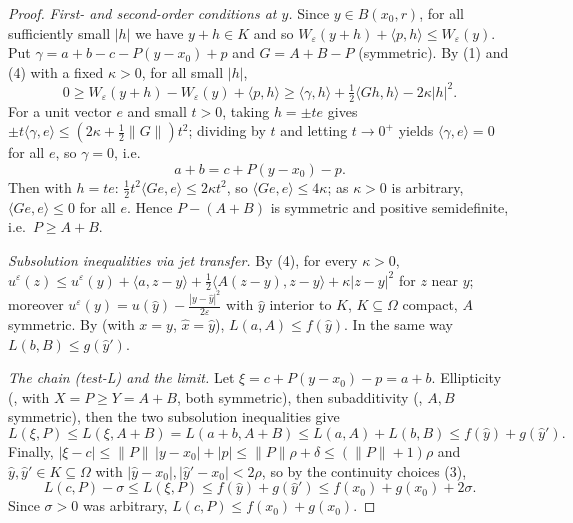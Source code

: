 \begin{proof}
\emph{First- and second-order conditions at $y$.} Since $y\in B(x_0,r)$, for all sufficiently small $|h|$ we have $y+h\in K$ and so $W_\varepsilon(y+h)+\langle p,h\rangle\le W_\varepsilon(y)$. Put $\gamma=a+b-c-P(y-x_0)+p$ and $G=A+B-P$ (symmetric). By (1) and (4) with a fixed $\kappa>0$, for all small $|h|$,
\[
0\ge W_\varepsilon(y+h)-W_\varepsilon(y)+\langle p,h\rangle\ge\langle\gamma,h\rangle+\tfrac12\langle Gh,h\rangle-2\kappa|h|^2 .
\]
For a unit vector $e$ and small $t>0$, taking $h=\pm te$ gives $\pm t\langle\gamma,e\rangle\le(2\kappa+\frac12\|G\|)t^2$; dividing by $t$ and letting $t\to0^+$ yields $\langle\gamma,e\rangle=0$ for all $e$, so $\gamma=0$, i.e.
\[
a+b=c+P(y-x_0)-p .
\]
Then with $h=te$: $\frac12t^2\langle Ge,e\rangle\le2\kappa t^2$, so $\langle Ge,e\rangle\le4\kappa$; as $\kappa>0$ is arbitrary, $\langle Ge,e\rangle\le0$ for all $e$. Hence $P-(A+B)$ is symmetric and positive semidefinite, i.e.\ $P\ge A+B$.

\emph{Subsolution inequalities via jet transfer.} By (4), for every $\kappa>0$, $u^\varepsilon(z)\le u^\varepsilon(y)+\langle a,z-y\rangle+\frac12\langle A(z-y),z-y\rangle+\kappa|z-y|^2$ for $z$ near $y$; moreover $u^\varepsilon(y)=u(\hat y)-\frac{|y-\hat y|^2}{2\varepsilon}$ with $\hat y$ interior to $K$, $K\subseteq\Omega$ compact, $A$ symmetric. By  (with $x=y$, $\hat x=\hat y$), $L(a,A)\le f(\hat y)$. In the same way $L(b,B)\le g(\hat y')$.

\emph{The chain (test-L) and the limit.} Let $\xi=c+P(y-x_0)-p=a+b$. Ellipticity (, with $X=P\ge Y=A+B$, both symmetric), then subadditivity (, $A,B$ symmetric), then the two subsolution inequalities give
\[
L(\xi,P)\le L(\xi,A+B)=L(a+b,A+B)\le L(a,A)+L(b,B)\le f(\hat y)+g(\hat y').
\]
Finally, $|\xi-c|\le\|P\|\,|y-x_0|+|p|\le\|P\|\rho+\delta\le(\|P\|+1)\rho$ and $\hat y,\hat y'\in K\subseteq\Omega$ with $|\hat y-x_0|,|\hat y'-x_0|<2\rho$, so by the continuity choices (3),
\[
L(c,P)-\sigma\le L(\xi,P)\le f(\hat y)+g(\hat y')\le f(x_0)+g(x_0)+2\sigma .
\]
Since $\sigma>0$ was arbitrary, $L(c,P)\le f(x_0)+g(x_0)$.
\end{proof}
